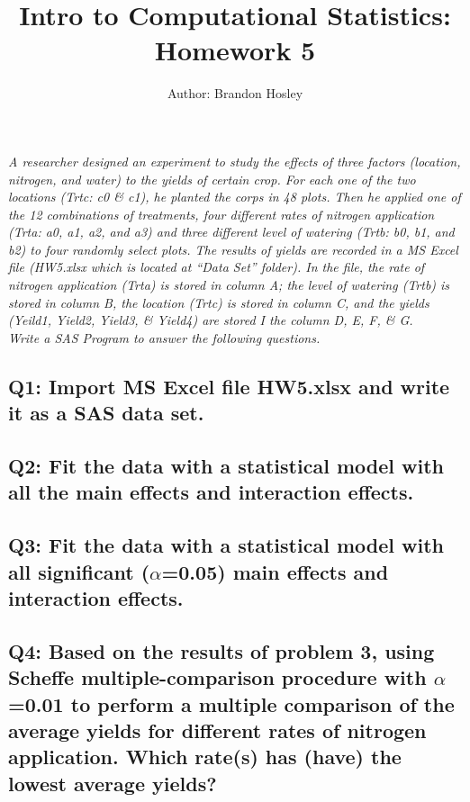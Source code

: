 \documentclass[a4paper,man,natbib]{apa6}
\title{Intro to Computational Statistics: Homework 5}
\author{Author: Brandon Hosley}
\affiliation{Instructor: Liang Kong, Ph.D}
\begin{document}
\maketitle
\singlespacing

\emph{A researcher designed an experiment to study the effects of three factors (location, nitrogen, and water) to the yields of certain crop. For each one of the two locations (Trtc: c0 \& c1), he planted the corps in 48 plots. Then he applied one of the 12 combinations of treatments, four different rates of nitrogen application (Trta: a0, a1, a2, and a3) and three different level of watering (Trtb: b0, b1, and b2) to four randomly select plots. The results of yields are recorded in a MS Excel file (HW5.xlsx which is located at “Data Set” folder). In the file, the rate of nitrogen application (Trta) is stored in column A; the level of watering (Trtb) is stored in column B, the location (Trtc) is stored in column C, and the yields (Yeild1, Yield2, Yield3, \& Yield4) are stored I the column D, E, F, \& G.
\\ Write a SAS Program to answer the following questions.
}
	
\subsection*{Q1: Import MS Excel file HW5.xlsx and write it as a SAS data set. }
% 

\subsection*{Q2: Fit the data with a statistical model with all the main effects and interaction effects. }
% 

\subsection*{Q3: Fit the data with a statistical model with all significant ($\alpha$=0.05) main effects and interaction effects. }
% 

\subsection*{Q4: Based on the results of problem 3, using Scheffe multiple-comparison procedure with $\alpha$=0.01 to perform a multiple comparison of the average yields for different rates of nitrogen application. Which rate(s) has (have) the lowest average yields? }
% 
\end{document}
